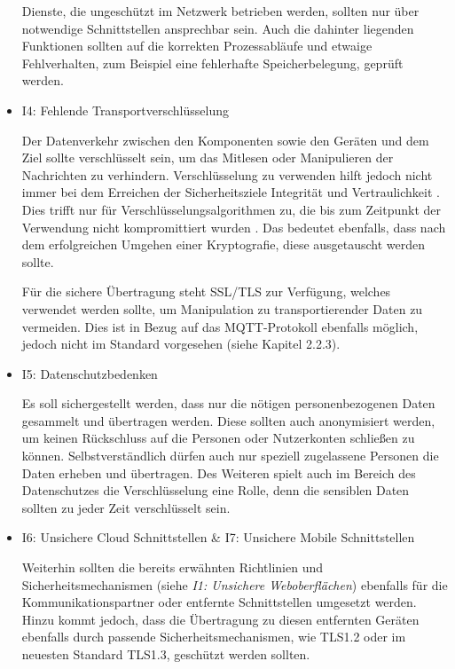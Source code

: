 \begin{itemize}
            Dienste, die ungeschützt im Netzwerk betrieben werden, sollten nur über notwendige Schnittstellen ansprechbar sein.
            Auch die dahinter liegenden Funktionen sollten auf die korrekten Prozessabläufe und etwaige Fehlverhalten, zum Beispiel eine fehlerhafte Speicherbelegung, geprüft werden.
            
            \item I4: Fehlende Transportverschlüsselung
            
            Der Datenverkehr zwischen den Komponenten sowie den Geräten und dem Ziel sollte verschlüsselt sein, um das Mitlesen oder Manipulieren der Nachrichten zu verhindern.
            Verschlüsselung zu verwenden hilft jedoch nicht immer bei dem Erreichen der Sicherheitsziele Integrität und Vertraulichkeit \cite{Bedner2010}. Dies trifft nur für Verschlüsselungsalgorithmen zu, die bis zum Zeitpunkt der Verwendung nicht kompromittiert wurden \cite{bsi_2019}. Das bedeutet ebenfalls, dass nach dem erfolgreichen Umgehen einer Kryptografie, diese ausgetauscht werden sollte.
            
            Für die sichere Übertragung steht SSL/TLS zur Verfügung, welches verwendet werden sollte, um Manipulation zu transportierender Daten zu vermeiden. Dies ist in Bezug auf das \ac{MQTT}-Protokoll ebenfalls möglich, jedoch nicht im Standard vorgesehen (siehe Kapitel 2.2.3).
            
            \item I5: Datenschutzbedenken
            
            Es soll sichergestellt werden, dass nur die nötigen personenbezogenen Daten gesammelt und übertragen werden. Diese sollten auch anonymisiert werden, um keinen Rückschluss auf die Personen oder Nutzerkonten schließen zu können.
            Selbstverständlich dürfen auch nur speziell zugelassene Personen die Daten erheben und übertragen.
            Des Weiteren spielt auch im Bereich des Datenschutzes die Verschlüsselung eine Rolle, denn die sensiblen Daten sollten zu jeder Zeit verschlüsselt sein.
    
            \item I6: Unsichere Cloud Schnittstellen \& I7: Unsichere Mobile Schnittstellen
            
            Weiterhin sollten die bereits erwähnten Richtlinien und Sicherheitsmechanismen (siehe \emph{I1: Unsichere Weboberflächen}) ebenfalls für die Kommunikationspartner oder entfernte Schnittstellen umgesetzt werden. Hinzu kommt jedoch, dass die Übertragung zu diesen entfernten Geräten ebenfalls durch passende Sicherheitsmechanismen, wie TLS1.2 oder im neuesten Standard TLS1.3, geschützt werden sollten.
            

\end{itemize}
